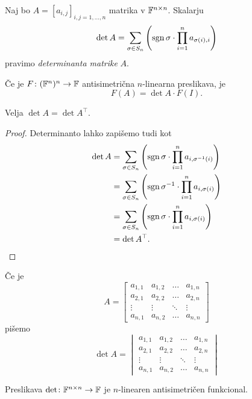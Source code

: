 \documentclass[12pt, a4paper]{article}
\begin{document}
\begin{okvir}
\begin{definicija}
Naj bo $A=[a_{i,j}]_{i,j=1,\dots,n}$ matrika v $\mathbb{F}^{n\times n}$. Skalarju
\[
\det A=\sum_{\sigma\in S_n} \left(\operatorname{sgn}\sigma\cdot\prod_{i=1}^n a_{\sigma(i),i}\right)
\]
pravimo \emph{determinanta matrike} $A$.
\end{definicija}
\end{okvir}

\begin{opomba}
Če je $F\colon (\mathbb{F}^n)^n\to\mathbb{F}$ antisimetrična $n$-linearna preslikava, je
\[
F(A)=\det A\cdot F(I).
\]
\end{opomba}

\begin{trditev}
Velja $\det A=\det A^\top$.
\end{trditev}

\begin{proof}
Determinanto lahko zapišemo tudi kot
\begin{align*}
\det A&=\sum_{\sigma\in S_n} \left(\operatorname{sgn}\sigma\cdot\prod_{i=1}^n a_{i,\sigma^{-1}(i)}\right)
\\
&=\sum_{\sigma\in S_n} \left(\operatorname{sgn}\sigma^{-1}\cdot\prod_{i=1}^n a_{i,\sigma(i)}\right)
\\
&=\sum_{\sigma\in S_n} \left(\operatorname{sgn}\sigma\cdot\prod_{i=1}^n a_{i,\sigma(i)}\right)
\\
&=\det A^\top.\qedhere
\end{align*}
\end{proof}

\begin{opomba}
Če je
\[
A=\begin{bmatrix}
a_{1,1} & a_{1,2} & \dots  & a_{1,n} \\ 
a_{2,1} & a_{2,2} & \dots  & a_{2,n} \\ 
\vdots  & \vdots  & \ddots & \vdots \\ 
a_{n,1} & a_{n,2} & \dots  & a_{n,n}
\end{bmatrix} 
\]
pišemo
\[
\det A=\begin{vmatrix}
a_{1,1} & a_{1,2} & \dots  & a_{1,n} \\ 
a_{2,1} & a_{2,2} & \dots  & a_{2,n} \\ 
\vdots  & \vdots  & \ddots & \vdots \\ 
a_{n,1} & a_{n,2} & \dots  & a_{n,n}
\end{vmatrix} 
\]
\end{opomba}

\begin{izrek}
Preslikava $\det\colon\mathbb{F}^{n\times n}\to\mathbb{F}$ je $n$-linearen antisimetričen funkcional.
\end{izrek}
\end{document}
